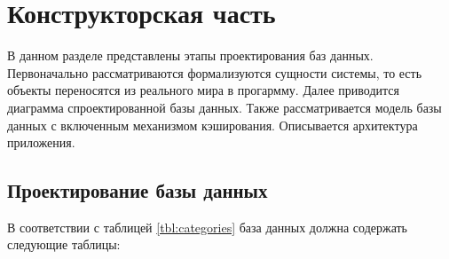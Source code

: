 \chapter{Конструкторская часть}

В данном разделе представлены этапы проектирования баз данных. Первоначально рассматриваются формализуются сущности системы, то есть объекты переносятся из реального мира в прогармму. Далее приводится диаграмма спроектированной базы данных. Также рассматривается модель базы данных с включенным механизмом кэширования. Описывается архитектура приложения.


\section{Проектирование базы данных}

В соответствии с таблицей \ref*{tbl:categories} база данных должна содержать следующие таблицы:


\begin{table}[H]
	\centering
	\caption{Company (таблица компаний)}
	\label{tbl:companies}
\end{table}



